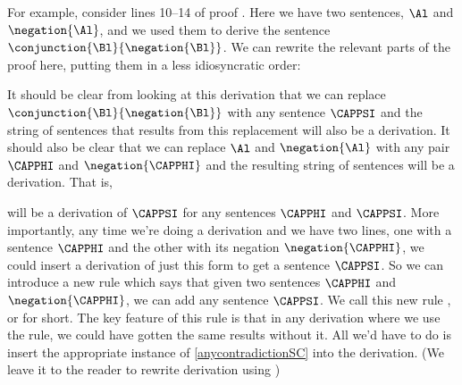 For example, consider lines 10--14 of proof . Here we have two sentences, $\Al$ and $\negation{\Al}$, and we used them to derive the sentence $\conjunction{\Bl}{\negation{\Bl}}$. 
We can rewrite the relevant parts of the proof here, putting them in a less idiosyncratic order:
\begin{gproof}
\end{gproof}
It should be clear from looking at this derivation that we can replace $\conjunction{\Bl}{\negation{\Bl}}$ with any sentence $\CAPPSI$ and the string of sentences that results from this replacement will also be a derivation. 
It should also be clear that we can replace $\Al$ and $\negation{\Al}$ with any pair $\CAPPHI$ and $\negation{\CAPPHI}$ and the resulting string of sentences will be a derivation. 
That is,
\begin{gproof}[\label{anycontradictionSC}]
\end{gproof}
will be a derivation of $\CAPPSI$ for any sentences $\CAPPHI$ and $\CAPPSI$. 
More importantly, any time we're doing a derivation and we have two lines, one with a sentence $\CAPPHI$ and the other with its negation $\negation{\CAPPHI}$, we could insert a derivation of just this form to get a sentence $\CAPPSI$. 
So we can introduce a new rule which says that given two sentences $\CAPPHI$ and $\negation{\CAPPHI}$, we can add any sentence $\CAPPSI$. 
We call this new rule , or  for short. 
The key feature of this rule is that in any derivation where we use the rule, we could have gotten the same results without it. 
All we'd have to do is insert the appropriate instance of \ref{anycontradictionSC} into the derivation. (We leave it to the reader to rewrite derivation  using )

